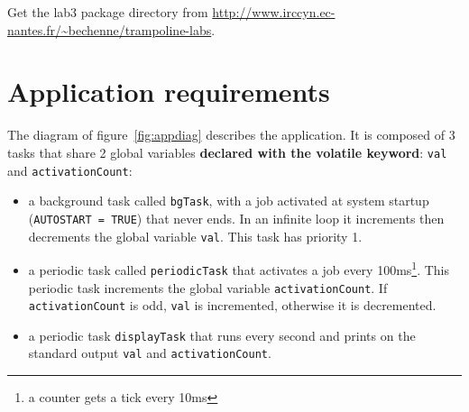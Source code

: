 \documentclass[11pt]{report}
\begin{document}
Get the lab3 package directory from \url{http://www.irccyn.ec-nantes.fr/~bechenne/trampoline-labs}.

\section{Application requirements}

The diagram of figure~\ref{fig:appdiag} describes the application.
It is composed of 3 tasks that share 2 global variables {\bf declared with the volatile keyword}: \texttt{val} and \texttt{activationCount}:
\begin{itemize}
\item a background task called \texttt{bgTask}, with a job activated at system startup (\texttt{AUTOSTART = TRUE}) that never ends. In an infinite loop it increments then decrements the global variable \texttt{val}. This task has priority 1.
\item a periodic task called \texttt{periodicTask} that activates a job every 100ms\footnote{a counter gets a tick every 10ms}. This periodic task increments the global variable \texttt{activationCount}. If \texttt{activationCount} is odd, \texttt{val} is incremented, otherwise it is decremented.
\item a periodic task \texttt{displayTask} that runs every second and prints on the standard output \texttt{val} and \texttt{activationCount}.
\end{itemize}

\def\alarm#1#2{
  \node[alarm](#1) [#2] {};
  \coordinate (a) at ($(#1.north)$);
  \coordinate (b) at ($(#1.north east)$);
  \coordinate (c) at ($(#1.north west)$);
  \coordinate (d) at ($(#1)$);
  \draw[thick] ($(a)+(-0.1,0)$) rectangle ($(a)+(0.1,0.1)$);
  \draw[rotate=-45,thick] ($(b)+(-0.05,0)$) rectangle ($(b)+(0.05,0.1)$);
  \draw[rotate=45,thick] ($(c)+(-0.05,0)$) rectangle ($(c)+(0.05,0.1)$);
  \draw ($(d)+(0.3,0)$) -- (d) -- ($(d)+(0,0.3)$);
  \node [font=\scriptsize,below=0.5mm of #1] {{\em Alarm}}
}

\def\sharedvar#1#2#3{
  \node (#1) [#2] {#1};
  \coordinate (a) at ($(#1.north #3) + (0,0.2)$);
  \coordinate (b) at ($(#1.south #3) + (0,-0.2)$);
  \draw[ultra thick] (a) -- (b);
  \draw ($(a)+(-0.1,0)$) -- ($(a)+(0.1,0)$);
  \draw ($(b)+(-0.1,0)$) -- ($(b)+(0.1,0)$)
}

\def\varrect#1{
  \draw ($(#1.south west)$) rectangle ($(#1.north east)$)
}
\end{document}
